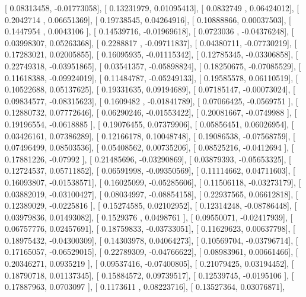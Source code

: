 \documentclass{article}
\begin{document}
       [ 0.08313458, -0.01773058],
       [ 0.13231979,  0.01095413],
       [ 0.0832749 ,  0.06424012],
       [ 0.2042714 ,  0.06651369],
       [ 0.19738545,  0.04264916],
       [ 0.10888866,  0.00037503],
       [ 0.1447954 ,  0.0043106 ],
       [ 0.14539716, -0.01969618],
       [ 0.0723036 , -0.04376248],
       [ 0.03998307,  0.05263368],
       [ 0.2288817 , -0.09711837],
       [ 0.04380711, -0.07730219],
       [ 0.17283021,  0.02005855],
       [ 0.16095935, -0.01115342],
       [ 0.12785345, -0.03306858],
       [ 0.22749318, -0.03951865],
       [ 0.03541357, -0.05898824],
       [ 0.18250675, -0.07085529],
       [ 0.11618388, -0.09924019],
       [ 0.11484787, -0.05249133],
       [ 0.19585578,  0.06110519],
       [ 0.10522688,  0.05137625],
       [ 0.19331635,  0.09194689],
       [ 0.07185147, -0.00073024],
       [ 0.09834577, -0.08315623],
       [ 0.1609482 , -0.01841789],
       [ 0.07066425, -0.0569751 ],
       [ 0.12880732,  0.07772646],
       [ 0.06290246, -0.01553422],
       [ 0.20081667, -0.0749988 ],
       [ 0.19196554, -0.0618885 ],
       [ 0.19076455,  0.07379906],
       [ 0.05856451,  0.06026954],
       [ 0.03426161,  0.07386289],
       [ 0.12166178,  0.10048748],
       [ 0.19086538, -0.07568759],
       [ 0.07496499,  0.08503536],
       [ 0.05408562,  0.00735206],
       [ 0.08525216, -0.0412694 ],
       [ 0.17881226, -0.07992   ],
       [ 0.21485696, -0.03290869],
       [ 0.03879393, -0.05653325],
       [ 0.12724537,  0.05711852],
       [ 0.06591998, -0.09350569],
       [ 0.11114662,  0.04711603],
       [ 0.16093807, -0.01538571],
       [ 0.16025099, -0.05285606],
       [ 0.11506118, -0.03273179],
       [ 0.03882019, -0.03100427],
       [ 0.08034997, -0.08854158],
       [ 0.22937565,  0.06612818],
       [ 0.12389029, -0.0225816 ],
       [ 0.15274585,  0.02102952],
       [ 0.12314248, -0.08786448],
       [ 0.03979836,  0.01493082],
       [ 0.1529376 ,  0.0498761 ],
       [ 0.09550071, -0.02417939],
       [ 0.06757776,  0.02457691],
       [ 0.18759833, -0.03733051],
       [ 0.11629623,  0.00637798],
       [ 0.18975432, -0.04300309],
       [ 0.14303978,  0.04064273],
       [ 0.10569704, -0.03796714],
       [ 0.17165057, -0.06529015],
       [ 0.22789309, -0.04766622],
       [ 0.08983961,  0.00661466],
       [ 0.20346271,  0.0935219 ],
       [ 0.09537416, -0.07400805],
       [ 0.21079425,  0.03194452],
       [ 0.18790718,  0.01137345],
       [ 0.15884572,  0.09739517],
       [ 0.12539745, -0.0195106 ],
       [ 0.17887963,  0.0703097 ],
       [ 0.1173611 ,  0.08223716],
       [ 0.13527364,  0.03076871],
\end{document}
